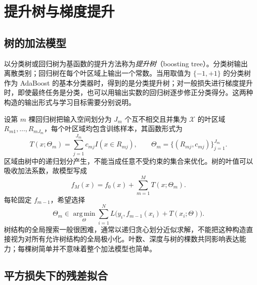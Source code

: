 \section{提升树与梯度提升}
\label{sec:lh-boost-trees}

\subsection{树的加法模型}
\label{subsec:lh-boost-tree-model}

以分类树或回归树为基函数的提升方法称为\emph{提升树}（boosting tree）。分类树输出离散类别；回归树在每个叶区域上输出一个常数。当用取值为 $\{-1,+1\}$ 的分类树作为 AdaBoost 的基本分类器时，得到的是分类提升树；对一般损失进行梯度提升时，即使最终任务是分类，也可以用输出实数的回归树逐步修正分类得分。这两种构造的输出形式与学习目标需要分别说明。

设第 $m$ 棵回归树把输入空间划分为 $J_m$ 个互不相交且并集为 $\mathcal X$ 的叶区域 $R_{m1},\ldots,R_{mJ_m}$，每个叶区域均包含训练样本，其函数形式为
\begin{equation}
 T(x;\Theta_m)=\sum_{j=1}^{J_m}c_{mj}I(x\in R_{mj}),\qquad
 \Theta_m=\{(R_{mj},c_{mj})\}_{j=1}^{J_m}.
 \label{eq:lh-boost-regression-tree}
\end{equation}
区域由树中的递归划分产生，不能当成任意不受约束的集合来优化。树的叶值可以吸收加法系数，故模型写成
\begin{equation}
 f_M(x)=f_0(x)+\sum_{m=1}^{M}T(x;\Theta_m).
 \label{eq:lh-boost-tree-ensemble}
\end{equation}
每轮固定 $f_{m-1}$，希望选择
\begin{equation}
 \Theta_m\in\operatorname*{arg\,min}_{\Theta}
 \sum_{i=1}^{N}L\bigl(y_i,f_{m-1}(x_i)+T(x_i;\Theta)\bigr).
 \label{eq:lh-boost-tree-stage}
\end{equation}
树结构的全局搜索一般很困难，通常以递归贪心划分近似求解，不能把这种构造直接视为对所有允许树结构的全局极小化。叶数、深度与树的棵数共同影响表达能力；每棵树简单并不意味着整个加法模型也简单。

\subsection{平方损失下的残差拟合}
\label{subsec:lh-boost-residual}

